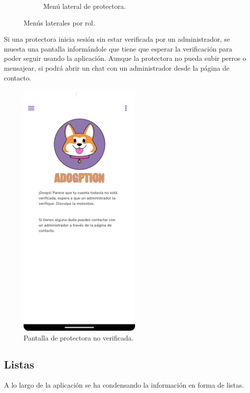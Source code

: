 \documentclass[a4paper, 12pt]{article}
\begin{document}
\begin{figure}[H]
\begin{subfigure}{0.48\textwidth}
\begin{center}
			\caption{Menú lateral de protectora.}
		\end{center}  
	\end{subfigure}\hfill
	\caption{Menús laterales por rol.}
\end{figure}


Si una protectora inicia sesión sin estar verificada por un administrador, se muesta una pantalla informándole que tiene que esperar la verificación para poder seguir usando la aplicación. Aunque la protectora no pueda subir perros o mensajear, si podrá abrir un chat con un administrador desde la página de contacto.


\begin{figure}[H]
	\begin{center}
		{\includegraphics[width=6cm]{app/UnverifiedPage.png}\par}
		\caption{Pantalla de protectora no verificada.}
	\end{center}  
\end{figure}



\newpage
\subsection*{Listas}

A lo largo de la aplicación se ha condensando la información en forma de listas.
\end{document}
